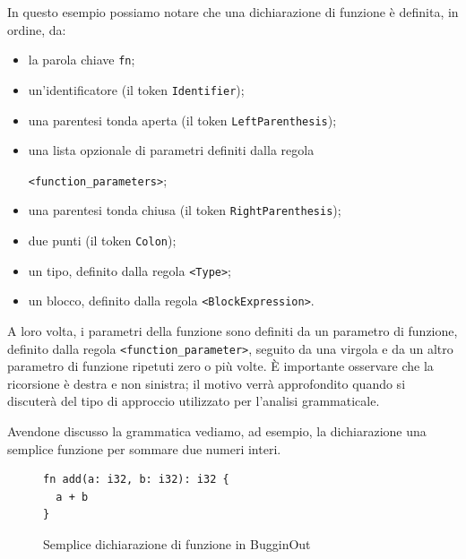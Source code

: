 In questo esempio possiamo notare che una dichiarazione di funzione \`e definita, in ordine, da:
\begin{itemize}
	\item la parola chiave \texttt{fn};
	\item un'identificatore (il token \texttt{Identifier});
	\item una parentesi tonda aperta (il token \texttt{LeftParenthesis});
	\item una lista opzionale di parametri definiti dalla regola \raggedright\texttt{<function\_parameters>};
	\item una parentesi tonda chiusa (il token \texttt{RightParenthesis});
	\item due punti (il token \texttt{Colon});
	\item un tipo, definito dalla regola \texttt{<Type>};
	\item un blocco, definito dalla regola \texttt{<BlockExpression>}.
\end{itemize}

A loro volta, i parametri della funzione sono definiti da un parametro di funzione, definito dalla regola \texttt{<function\_parameter>}, seguito da una virgola e da un altro parametro di funzione ripetuti zero o pi\`u volte. \`E importante osservare che la ricorsione \`e destra e non sinistra; il motivo verr\`a approfondito quando si discuter\`a del tipo di approccio utilizzato per l'analisi grammaticale.

Avendone discusso la grammatica vediamo, ad esempio, la dichiarazione una semplice funzione per sommare due numeri interi.
\begin{figure}[H]
	\centering
	\begin{verbatim}
fn add(a: i32, b: i32): i32 {
  a + b
}
	\end{verbatim}
	\label{fig:bugginout-example-function-declaration}
	\caption{Semplice dichiarazione di funzione in BugginOut}
\end{figure}

